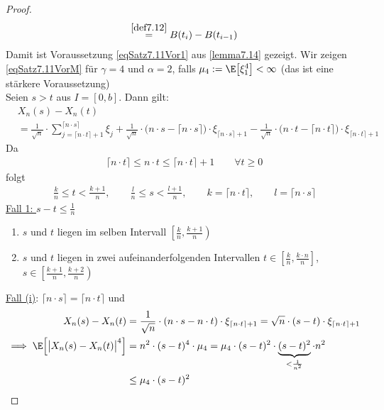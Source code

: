 \begin{proof}
\begin{align*}
{		\overset{\ref{def7.12}}{=}B(t_i)-B(t_{i-1})}
	\end{align*}
	Damit ist Voraussetzung \eqref{eqSatz7.11Vor1} aus \ref{lemma7.14} gezeigt.\nl
	Wir zeigen \eqref{eqSatz7.11VorM} für $\gamma=4$ und $\alpha=2$, falls $\mu_4:=\E\big[\xi_1^4\big]<\infty$ (das ist eine stärkere Voraussetzung)\\
	Seien $s>t$ aus $I=[0,b]$. 
	Dann gilt:
	\begin{align}\label{eqProof7.16Plus}\tag{+}
		&X_n(s)-X_n(t)\\
		&=\frac{1}{\sqrt{n}}\cdot\sum\limits_{j=\lceil n\cdot t\rceil+1}^{\lceil n\cdot s\rceil}\xi_j+\frac{1}{\sqrt{n}}\cdot\big(n\cdot s-\lceil n\cdot s\rceil\big)\cdot\xi_{\lceil n\cdot s\rceil+1}
		-\frac{1}{\sqrt{n}}\cdot\big(n\cdot t-\lceil n\cdot t\rceil\big)\cdot\xi_{\lceil n\cdot t\rceil+1}\nonumber
	\end{align}
	Da 
	\begin{align}\label{eqProof7.16PlusPlus}\tag{++}
		\lceil n\cdot t\rceil\leq n\cdot t\leq\lceil n\cdot t\rceil+1\qquad\forall t\geq0
	\end{align}
	folgt
	\begin{align*}
		\frac{k}{n}\leq t<\frac{k+1}{n},\qquad\frac{l}{n}\leq s<\frac{l+1}{n},\qquad k=\lceil n\cdot t\rceil,\qquad l=\lceil n\cdot s\rceil
	\end{align*}
	\underline{Fall 1: $s-t\leq\frac{1}{n}$}
	\begin{enumerate}[label=(\roman*)]
		\item $s$ und $t$ liegen im selben Intervall $\left[\frac{k}{n},\frac{k+1}{n}\right)$
		\item $s$ und $t$ liegen in zwei aufeinanderfolgenden Intervallen $t\in\left[\frac{k}{n},\frac{k\cdot n}{n}\right]$, $s\in\left[\frac{k+1}{n},\frac{k+2}{n}\right)$
	\end{enumerate}
	\ul{Fall (i)}: $\lceil n\cdot s\rceil=\lceil n\cdot t\rceil$ und
	\begin{align*}
		X_n(s)-X_n(t)
		&=\frac{1}{\sqrt{n}}\cdot(n\cdot s-n\cdot t)\cdot\xi_{\lceil n\cdot t\rceil+1}
		=\sqrt{n}\cdot(s-t)\cdot\xi_{\lceil n\cdot t\rceil+1}\\
		\implies
		\E\Big[\big|X_n(s)-X_n(t)\big|^4\Big]
		&=n^2\cdot(s-t)^4\cdot\mu_4
		=\mu_4\cdot(s-t)^2\cdot\underbrace{(s-t)^2}_{<\frac{1}{n^2}}\cdot n^2\\
		&\leq\mu_4\cdot(s-t)^2
	\end{align*}

\end{proof}
